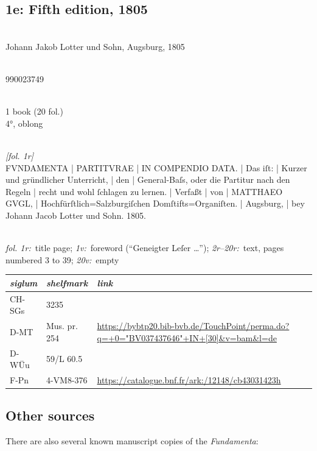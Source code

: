 \documentclass[abbrwidth=7em,shorttitlesize=55]{ees}
\begin{document}
\clearpage
\subsection{1e: Fifth edition, 1805}

\\
Johann Jakob Lotter und Sohn, Augsburg, 1805

\\
990023749

\\
1 book (20 fol.)\\
4°, oblong

\\
\textit{[fol. 1r]}\\
FVNDAMENTA | PARTITVRAE | IN COMPENDIO DATA. | Das iſt: | Kurzer und gründlicher Unterricht, | den | General-Baſs, oder die Partitur nach den Regeln | recht und wohl ſchlagen zu lernen. | Verfaßt | von | MATTHAEO GVGL, | Hochfürſtlich=Salzburgiſchen Domſtifts=Organiſten. | Augsburg, | bey Johann Jacob Lotter und Sohn. 1805.

\\
\textit{fol. 1r:}~title page; \textit{1v:}~foreword (“Geneigter Leſer …”); \textit{2r–20r:}~text, pages numbered 3 to 39; \textit{20v:}~empty

\begin{xltabular}{\textwidth}{llX}
  \toprule
  \itshape siglum & \itshape shelfmark & \itshape link \\
  \midrule
  \endhead
  CH-SGs & 3235 & \\
  D-MT & Mus. pr. 254 & \scriptsize\url{https://bybtp20.bib-bvb.de/TouchPoint/perma.do?q=+0="BV037437646"+IN+[30]&v=bam&l=de} \\
  D-WÜu & 59/L 60.5 & \\
  F-Pn & 4-VM8-376 & \scriptsize\url{https://catalogue.bnf.fr/ark:/12148/cb43031423h} \\
  \bottomrule
\end{xltabular}


\clearpage
\subsection{Other sources}

There are also several known manuscript copies of the \textit{Fundamenta}:
\end{document}

